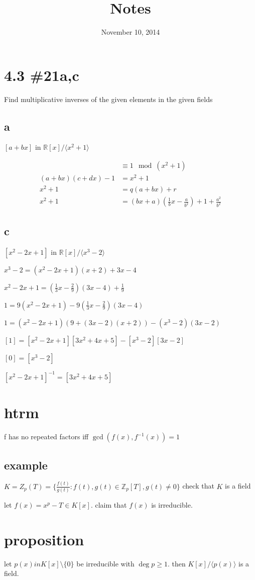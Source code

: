 \documentclass[letterpaper]{article}
\begin{document}
\title{Notes}
\date{November 10, 2014}
\maketitle
\section*{4.3 \#21a,c}
Find multiplicative inverses of the given elements in the given fields
\subsection*{a}
$[a+bx]$ in $\mathbb{R}[x]/\langle x^2+1\rangle$

\begin{align*}
  [a+bx][c+dx]&\equiv 1\mod (x^2+1)\\
  (a+bx)(c+dx)-1&=x^2+1\\
  x^2+1&=q(a+bx)+r\\
  x^2+1&=(bx+a)(\frac{1}{b}x-\frac{a}{b^2})+1+\frac{a^2}{b^2}
\end{align*}
\subsection*{c}
$[x^2-2x+1]$ in $\mathbb{R}[x]/\langle x^3-2\rangle$

$x^3-2=(x^2-2x+1)(x+2)+3x-4$

$x^2-2x+1=(\frac{1}{3}x-\frac{2}{9})(3x-4)+\frac{1}{9}$

$1=9(x^2-2x+1)-9(\frac{1}{3}x-\frac{2}{9})(3x-4)$

$1=(x^2-2x+1)(9+(3x-2)(x+2))-(x^3-2)(3x-2)$

$[1]=[x^2-2x+1][3x^2+4x+5]-[x^3-2][3x-2]$

$[0]=[x^3-2]$

$[x^2-2x+1]^{-1}=[3x^2+4x+5]$

\section*{htrm}
f has no repeated factors iff $\gcd(f(x),f^{-1}(x))=1$
\subsection*{example}
$K=Z_{p}(T)=\{\frac{f(t)}{g(t)}:f(t),g(t)\in \mathbb{Z}_p[T],g(t)\ne 0\}$ check that $K$ is a field

let $f(x)=x^p-T\in K[x]$. claim that $f(x)$ is irreducible.

\section*{proposition}
let $p(x)in K[x]\setminus \{0\}$ be irreducible with $\deg p\ge 1$. then $K[x]/\langle p(x)\rangle$ is a field.
\end{document}
